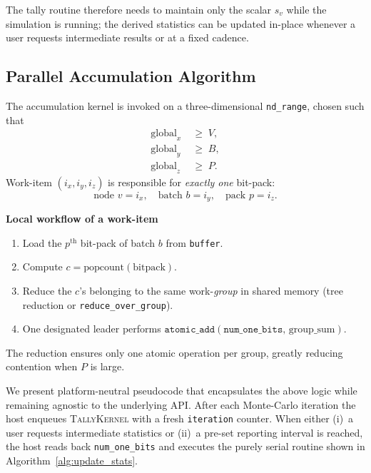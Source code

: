 The tally routine therefore needs to maintain only the scalar
\(s_v\) while the simulation is running; the derived statistics can be updated
in-place whenever a user requests intermediate results or at a fixed cadence.

\subsection{Parallel Accumulation Algorithm}

The accumulation kernel is invoked on a three-dimensional
\texttt{nd\_range}, chosen such that
\[
  \begin{aligned}
    \text{global}_x &\;\ge\; V,\\
    \text{global}_y &\;\ge\; B,\\
    \text{global}_z &\;\ge\; P.
  \end{aligned}
\]
Work-item \((i_x,i_y,i_z)\) is responsible for \emph{exactly one} bit-pack:
\[
  \text{node  } v=i_x,\quad
  \text{batch } b=i_y,\quad
  \text{pack  } p=i_z.
\]

\vspace{4pt}
\noindent
\textbf{Local workflow of a work-item}
\begin{enumerate}
    \item Load the \(p^{\text{th}}\) bit-pack of batch \(b\) from
          \texttt{buffer}.
    \item Compute \(c=\mathrm{popcount}(\text{bitpack})\).
    \item Reduce the \(c\)'s belonging to the same work-\emph{group} in
          shared memory (tree reduction or \texttt{reduce\_over\_group}).
    \item One designated leader performs
          \(\texttt{atomic\_add}(\texttt{num\_one\_bits},\,\text{group\_sum})\).
\end{enumerate}

The reduction ensures only one atomic operation per group, greatly reducing
contention when \(P\) is large.

We present platform-neutral pseudocode that encapsulates the above logic while remaining agnostic to the underlying API. After each Monte-Carlo iteration the host enqueues \textsc{TallyKernel} with a
fresh \texttt{iteration} counter.  When either (i)~a user requests
intermediate statistics or (ii)~a pre-set reporting interval is reached,
the host reads back \texttt{num\_one\_bits} and executes the purely
serial routine shown in Algorithm~\ref{alg:update_stats}.

